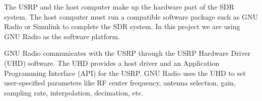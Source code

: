 The USRP and the host computer make up the hardware part of the SDR system. 
The host computer must run a compatible software package such as GNU Radio or
Simulink to complete the SDR system. In this project we are using GNU Radio
as the software platform.

GNU Radio communicates with the USRP through the USRP Hardware Driver (UHD)
software. The UHD provides a host driver and an Application Programming
Interface (API) for the USRP. GNU Radio uses the UHD to set user-specified
parameters like RF center frequency, antenna selection, gain, sampling rate,
interpolation, decimation, etc.

